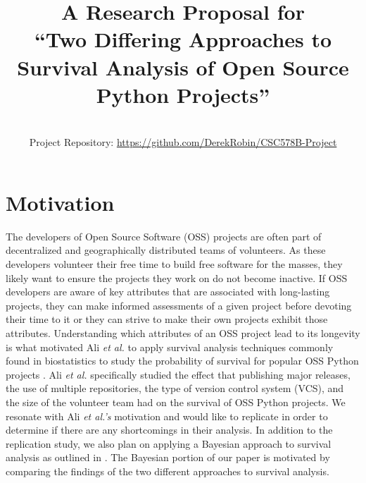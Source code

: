 \documentclass[conference]{IEEEtran}
\begin{document}


\title{A Research Proposal for \\``Two Differing Approaches to Survival Analysis of Open Source Python Projects''}

\author{
 \\
Project Repository: \url{https://github.com/DerekRobin/CSC578B-Project}
}

\maketitle

\section{Motivation}

The developers of Open Source Software (OSS) projects are often part of decentralized and geographically distributed teams of volunteers. As these developers volunteer their free time to build free software for the masses, they likely want to ensure the projects they work on do not become inactive. If OSS developers are aware of key attributes that are associated with long-lasting projects, they can make informed assessments of a given project before devoting their time to it or they can strive to make their own projects exhibit those attributes. Understanding which attributes of an OSS project lead to its longevity is what motivated Ali \emph{et al.} to apply survival analysis techniques commonly found in biostatistics to study the probability of survival for popular OSS Python projects \cite{ali2020cheating}. Ali \emph{et al.} specifically studied the effect that publishing major releases, the use of multiple repositories, the type of version control system (VCS), and the size of the volunteer team had on the survival of OSS Python projects. We resonate with Ali \emph{et al.'s} motivation and would like to replicate \cite{ali2020cheating} in order to determine if there are any shortcomings in their analysis. In addition to the replication study, we also plan on applying a Bayesian approach to survival analysis as outlined in \cite{kelter2020bayesian}. The Bayesian portion of our paper is motivated by comparing the findings of the two different approaches to survival analysis.
\end{document}
